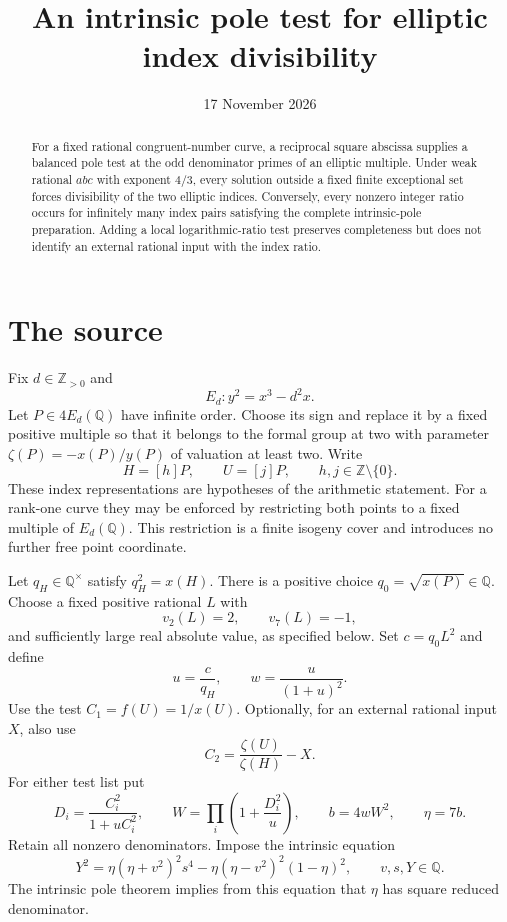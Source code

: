 \documentclass[11pt,a4paper]{article}
\title{An intrinsic pole test for elliptic index divisibility}
\author{}\date{17 November 2026}
\newcommand{\Q}{\mathbb Q}\newcommand{\Z}{\mathbb Z}
\begin{document}
\maketitle

\begin{abstract}
For a fixed rational congruent-number curve, a reciprocal square
abscissa supplies a balanced pole test at the odd denominator primes
of an elliptic multiple. Under weak rational $abc$ with exponent
$4/3$, every solution outside a fixed finite exceptional set forces
divisibility of the two elliptic indices. Conversely, every nonzero
integer ratio occurs for infinitely many index pairs satisfying the
complete intrinsic-pole preparation. Adding a local logarithmic-ratio
test preserves completeness but does not identify an external
rational input with the index ratio.
\end{abstract}

\section{The source}

Fix $d\in\Z_{>0}$ and
\[
                         E_d:y^2=x^3-d^2x.
\]
Let $P\in4E_d(\Q)$ have infinite order. Choose its sign and replace
it by a fixed positive multiple so that it belongs to the formal group at two with
parameter $\zeta(P)=-x(P)/y(P)$ of valuation at least two.
Write
\[
              H=[h]P,\qquad U=[j]P,\qquad h,j\in\Z\setminus\{0\}.
\]
These index representations are hypotheses of the arithmetic statement.
For a rank-one curve they may be enforced by restricting both points
to a fixed multiple of $E_d(\Q)$. This restriction is a finite
isogeny cover and introduces no further free point coordinate.

Let $q_H\in\Q^\times$ satisfy $q_H^2=x(H)$. There is a positive
choice $q_0=\sqrt{x(P)}\in\Q$. Choose a fixed positive rational
$L$ with
\[
                  v_2(L)=2,\qquad v_7(L)=-1,
\]
and sufficiently large real absolute value, as specified below. Set
$c=q_0L^2$ and define
\begin{equation}\label{eq:weight}
                       u=\frac c{q_H},\qquad w=\frac{u}{(1+u)^2}.
\end{equation}
Use the test $C_1=f(U)=1/x(U)$. Optionally, for an external rational
input $X$, also use
\[
                 C_2=\frac{\zeta(U)}{\zeta(H)}-X.
\]
For either test list put
\begin{equation}\label{eq:detector}
 D_i=\frac{C_i^2}{1+uC_i^2},\qquad
 W=\prod_i\left(1+\frac{D_i^2}{u}\right),\qquad
 b=4wW^2,\qquad \eta=7b.
\end{equation}
Retain all nonzero denominators. Impose the intrinsic equation
\begin{equation}\label{eq:pole}
 Y^2=\eta(\eta+v^2)^2s^4
             -\eta(\eta-v^2)^2(1-\eta)^2,
                \qquad v,s,Y\in\Q.
\end{equation}
The intrinsic pole theorem \cite{Intrinsic} implies from this equation
that $\eta$ has square reduced denominator.
\end{document}
